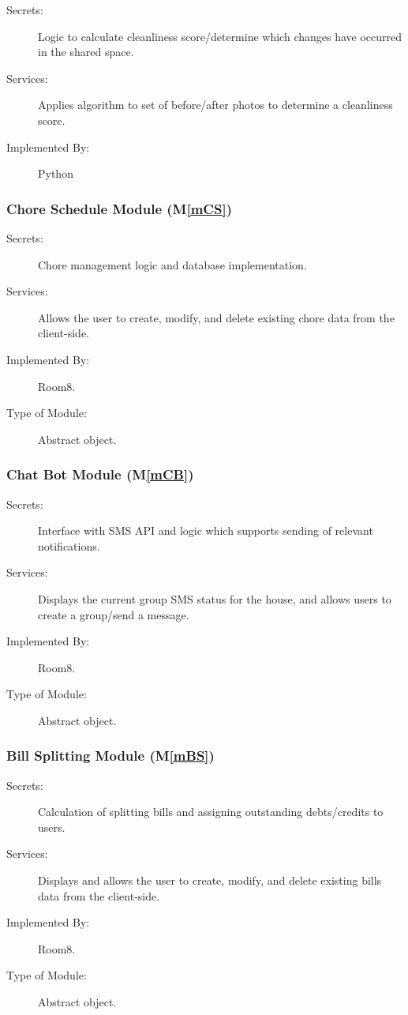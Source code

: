 \documentclass[12pt, titlepage]{article}
\newcommand{\mref}[1]{M\ref{#1}}
\begin{document}
\begin{description}
\item[Secrets:] Logic to calculate cleanliness score/determine which changes have occurred in the shared space.
\item[Services:] Applies algorithm to set of before/after photos to determine a cleanliness score.
\item[Implemented By:] Python
\end{description}

\subsubsection{Chore Schedule Module (\mref{mCS})}
\begin{description}
\item[Secrets:] Chore management logic and database implementation.
\item[Services:] Allows the user to create, modify, and delete existing chore data from the client-side.
\item[Implemented By:] Room8.
\item[Type of Module:] Abstract object.
\end{description}

\subsubsection{Chat Bot Module (\mref{mCB})}
\begin{description}
\item[Secrets:] Interface with SMS API and logic which supports sending of relevant notifications.
\item[Services:] Displays the current group SMS status for the house, and allows users to create a group/send a message.
\item[Implemented By:] Room8.
\item[Type of Module:] Abstract object.
\end{description}

\subsubsection{Bill Splitting Module (\mref{mBS})}
\begin{description}
\item[Secrets:] Calculation of splitting bills and assigning outstanding debts/credits to users.
\item[Services:] Displays and allows the user to create, modify, and delete existing bills data from the client-side.
\item[Implemented By:] Room8.
\item[Type of Module:] Abstract object.
\end{description}
\end{document}
